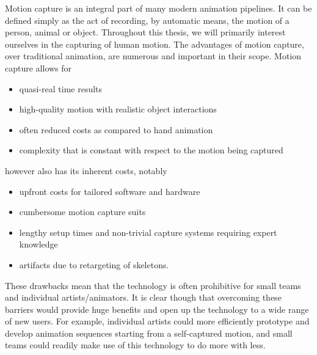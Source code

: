 Motion capture is an integral part of many modern animation pipelines. It can be defined simply as the act of recording, by automatic means, the motion of a person, animal or object. Throughout this thesis, we will primarily interest ourselves in the capturing of human motion. The advantages of motion capture, over traditional animation, are numerous and important in their scope. Motion capture allows for
\begin{itemize}
    \item quasi-real time results
    \item high-quality motion with realistic object interactions
    \item often reduced costs as compared to hand animation
    \item complexity that is constant with respect to the motion being captured
\end{itemize}
however also has its inherent costs, notably
\begin{itemize}
    \item upfront costs for tailored software and hardware
    \item cumbersome motion capture suits 
    \item lengthy setup times and non-trivial capture systems requiring expert knowledge
    \item artifacts due to retargeting of skeletons.
\end{itemize}
These drawbacks mean that the technology is often prohibitive for small teams and individual artists/animators. It is clear though that overcoming these barriers would provide huge benefits and open up the technology to a wide range of new users. For example, individual artists could more efficiently prototype and develop animation sequences starting from a self-captured motion, and small teams could readily make use of this technology to do more with less.

